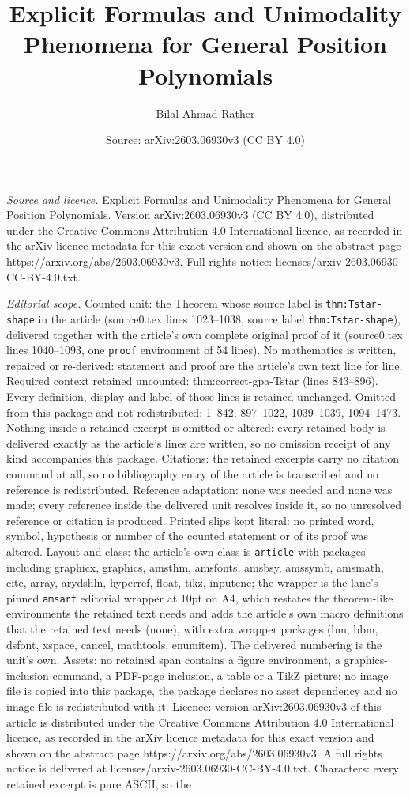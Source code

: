 \documentclass[10pt,a4paper]{amsart}
\title[Explicit Formulas and Unimodality Phenomena for General Posi]{Explicit Formulas and Unimodality Phenomena for General Position Polynomials}
\author{Bilal Ahmad Rather}
\date{Source: arXiv:2603.06930v3 (CC BY 4.0)}
\begin{document}
\maketitle

\noindent\emph{Source and licence.} Explicit Formulas and Unimodality Phenomena for General Position Polynomials. Version arXiv:2603.06930v3 (CC BY 4.0), distributed under the Creative Commons Attribution 4.0 International licence, as recorded in the arXiv licence metadata for this exact version and shown on the abstract page https://arxiv.org/abs/2603.06930v3. Full rights notice: licenses/arxiv-2603.06930-CC-BY-4.0.txt.\par\smallskip

\noindent\textit{Editorial scope.} Counted unit: the Theorem whose source label is \texttt{thm:Tstar-shape} in the article (source0.tex lines 1023--1038, source label \texttt{thm:Tstar-shape}), delivered together with the article's own complete original proof of it (source0.tex lines 1040--1093, one \texttt{proof} environment of 54 lines). No mathematics is written, repaired or re-derived: statement and proof are the article's own text line for line. Required context retained uncounted: thm:correct-gpa-Tstar (lines 843--896). Every definition, display and label of those lines is retained unchanged. Omitted from this package and not redistributed: 1--842, 897--1022, 1039--1039, 1094--1473. Nothing inside a retained excerpt is omitted or altered: every retained body is delivered exactly as the article's lines are written, so no omission receipt of any kind accompanies this package. Citations: the retained excerpts carry no citation command at all, so no bibliography entry of the article is transcribed and no reference is redistributed. Reference adaptation: none was needed and none was made; every reference inside the delivered unit resolves inside it, so no unresolved reference or citation is produced. Printed slips kept literal: no printed word, symbol, hypothesis or number of the counted statement or of its proof was altered. Layout and class: the article's own class is \texttt{article} with packages including graphicx, graphics, amsthm, amsfonts, amsbsy, amssymb, amsmath, cite, array, arydshln, hyperref, float, tikz, inputenc; the wrapper is the lane's pinned \texttt{amsart} editorial wrapper at 10pt on A4, which restates the theorem-like environments the retained text needs and adds the article's own macro definitions that the retained text needs (none), with extra wrapper packages (bm, bbm, dsfont, xspace, cancel, mathtools, enumitem). The delivered numbering is the unit's own. Assets: no retained span contains a figure environment, a graphics-inclusion command, a PDF-page inclusion, a table or a TikZ picture; no image file is copied into this package, the package declares no asset dependency and no image file is redistributed with it. Licence: version arXiv:2603.06930v3 of this article is distributed under the Creative Commons Attribution 4.0 International licence, as recorded in the arXiv licence metadata for this exact version and shown on the abstract page https://arxiv.org/abs/2603.06930v3. A full rights notice is delivered at licenses/arxiv-2603.06930-CC-BY-4.0.txt. Characters: every retained excerpt is pure ASCII, so the 
\end{document}

